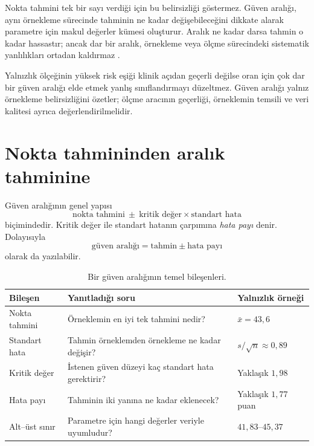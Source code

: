 Nokta tahmini tek bir sayı verdiği için bu belirsizliği göstermez. Güven
aralığı, aynı örnekleme sürecinde tahminin ne kadar değişebileceğini dikkate
alarak parametre için makul değerler kümesi oluşturur. Aralık ne kadar darsa
tahmin o kadar hassastır; ancak dar bir aralık, örnekleme veya ölçme sürecindeki
sistematik yanlılıkları ortadan kaldırmaz \cite{casella2002,wasserman2004}.

\begin{researchbox}
Yalnızlık ölçeğinin yüksek risk eşiği klinik açıdan geçerli değilse oran için
çok dar bir güven aralığı elde etmek yanlış sınıflandırmayı düzeltmez. Güven
aralığı yalnız örnekleme belirsizliğini özetler; ölçme aracının geçerliği,
örneklemin temsili ve veri kalitesi ayrıca değerlendirilmelidir.
\end{researchbox}

\section{Nokta tahmininden aralık tahminine}

Güven aralığının genel yapısı
\[
\text{nokta tahmini}\ \pm\
\text{kritik değer}\times\text{standart hata}
\]
biçimindedir. Kritik değer ile standart hatanın çarpımına \emph{hata payı}
denir. Dolayısıyla
\[
\text{güven aralığı}=\text{tahmin}\pm\text{hata payı}
\]
olarak da yazılabilir.

\begin{table}[htbp]
\centering
\caption{Bir güven aralığının temel bileşenleri.}
\begin{tabular}{@{}p{}p{}p{}@{}}
\toprule
Bileşen & Yanıtladığı soru & Yalnızlık örneği \\
\midrule
Nokta tahmini & Örneklemin en iyi tek tahmini nedir? & $\bar x=43{,}6$ \\
Standart hata & Tahmin örneklemden örnekleme ne kadar değişir? & $s/\sqrt n\approx0{,}89$ \\
Kritik değer & İstenen güven düzeyi kaç standart hata gerektirir? & Yaklaşık $1{,}98$ \\
Hata payı & Tahminin iki yanına ne kadar eklenecek? & Yaklaşık $1{,}77$ puan \\
Alt--üst sınır & Parametre için hangi değerler veriyle uyumludur? & $41{,}83$--$45{,}37$ \\
\bottomrule
\end{tabular}
\end{table}

